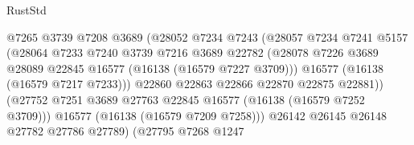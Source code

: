 \begin{lexlean}{RustStd}
\begin{coremodule}
                                        @7265
                                        @3739
                                        @7208
                                        @3689
                                        (@28052
                                          @7234
                                          @7243
                                          (@28057
                                            @7234
                                            @7241
                                            @5157
                                            (@28064
                                              @7233
                                              @7240
                                              @3739
                                              @7216
                                              @3689
                                              @22782
                                              (@28078
                                                @7226
                                                @3689
                                                @28089
                                                @22845
                                                @16577
                                                (@16138 (@16579 @7227 @3709)))
                                              @16577
                                              (@16138 (@16579 @7217 @7233)))
                                            @22860
                                            @22863
                                            @22866
                                            @22870
                                            @22875
                                            @22881))
                                        (@27752
                                          @7251
                                          @3689
                                          @27763
                                          @22845
                                          @16577
                                          (@16138 (@16579 @7252 @3709)))
                                        @16577
                                        (@16138 (@16579 @7209 @7258)))
                                      @26142
                                      @26145
                                      @26148
                                      @27782
                                      @27786
                                      @27789)
                                    (@27795
                                      @7268
                                      @1247

\end{coremodule}
\end{lexlean}
